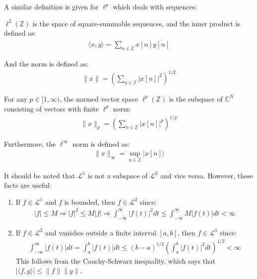 A similar definition is given for $\ell^p$ which deals with sequences:
\begin{definition}
$\ell^2(\mathbb{Z})$ is the space of square-summable sequences, and the inner product is defined as:
\begin{align*}
\langle x,y \rangle = \sum_{n\in\mathbb{Z}} x[n] \overline{y[n]}
\end{align*}

And the norm is defined as:
\begin{align*}
\|x\| = \left( \sum_{n\in\mathbb{Z}} |x[n]|^2 \right)^{1/2}
\end{align*}

For any $p \in [1,\infty)$, the normed vector space $\ell^p(\mathbb{Z})$ is the subspace of $\mathbb{C}^N$ consisting of vectors with finite $\ell^p$ norm:
\begin{align*}
\|x\|_p = \left( \sum_{n\in\mathbb{Z}} |x[n]|^p \right)^{1/p}
\end{align*}

Furthermore, the $\ell^\infty$ norm is defined as:
\begin{align*}
\|x\|_\infty = \sup_{n\in\mathbb{Z}}|x[n]|
\end{align*}
\end{definition}

It should be noted that $\mathcal{L}^1$ is not a subspace of $\mathcal{L}^2$ and vice versa. However, these facts are useful:
\begin{enumerate}
\item If $f \in \mathcal{L}^1$ and $f$ is bounded, then $f \in \mathcal{L}^2$ since:
\begin{align*}
|f| \leq M \Rightarrow |f|^2 \leq M|f| \Rightarrow \int_{-\infty}^\infty |f(t)|^2 dt \leq \int_{-\infty}^\infty M|f(t)| dt < \infty
\end{align*}
\item If $f \in \mathcal{L}^2$ and vanishes outside a finite interval $[a,b]$, then $f \in \mathcal{L}^1$ since: 
\begin{align*}
\int_{-\infty}^\infty |f(t)| dt = \int_a^b |f(t)| dt \leq (b - a)^{1/2} \left( \int_a^b |f(t)|^2 dt \right)^{1/2} < \infty
\end{align*}
This follows from the Cauchy-Schwarz inequality, which says that $|\langle f,g \rangle| \leq \|f\| \|g\|$.
\end{enumerate}



